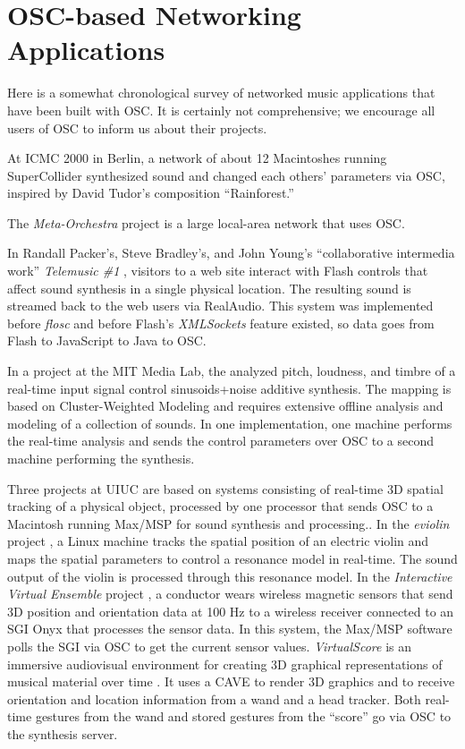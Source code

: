 \section{OSC-based Networking Applications}

Here is a somewhat chronological survey of networked music applications that
have been built with OSC.  It is certainly not comprehensive; we encourage all
users of OSC to inform us about their projects.

At ICMC 2000 in Berlin, a network of about 12
Macintoshes running SuperCollider synthesized sound and changed each others'
parameters via OSC, inspired by David Tudor's composition ``Rainforest.''

The \textit{Meta-Orchestra} project \cite{Impett:2001} is a large local-area network that uses
OSC.

In Randall Packer's, Steve Bradley's, and John Young's ``collaborative
intermedia work'' \textit{Telemusic \#1} \cite{Young:2001}, visitors to a web site interact
with Flash controls that affect sound synthesis in a single physical location. 
The resulting sound is streamed back to the web users via RealAudio. This system
was implemented before \textit{flosc} and before Flash's \textit{XMLSockets}
feature existed, so data goes from Flash to JavaScript to Java to OSC.

In a project \cite{Jehan:2001} at the MIT Media Lab, the analyzed pitch, loudness, and timbre
of a real-time input signal control sinusoids+noise additive synthesis.  The
mapping is based on Cluster-Weighted Modeling and requires extensive offline
analysis and modeling of a collection of sounds.  In one implementation, one
machine performs the real-time analysis and sends the control parameters over OSC
to a second machine performing the synthesis.

Three projects at UIUC are based on systems consisting of real-time 3D spatial
tracking of a physical object, processed by one processor that sends OSC to a
Macintosh running Max/MSP for sound synthesis and processing..  In the
\textit{eviolin} project \cite{Goudeseune:2001a}, a Linux machine tracks the spatial position of an
electric violin and maps the spatial parameters to control a resonance model in
real-time.  The sound output of the violin is processed through this resonance
model. In the \textit{Interactive Virtual Ensemble} project \cite{Garnett:2001}, a conductor
wears wireless magnetic sensors that send 3D position and orientation data at 100
Hz to a wireless receiver connected to an SGI Onyx that processes the sensor
data.  In this system, the Max/MSP software polls the SGI via OSC to get the
current sensor values.  \textit{VirtualScore} is an immersive audiovisual
environment for creating 3D graphical representations of musical material over
time \cite{Garnett:2002}.  It uses a CAVE to render 3D graphics and to receive orientation and
location information from a wand and a head tracker.  Both real-time gestures
from the wand and stored gestures from the ``score'' go via OSC to the synthesis
server.

